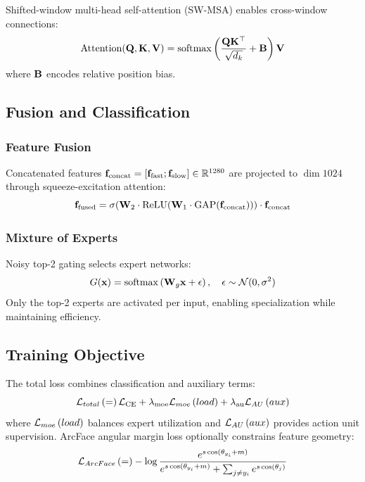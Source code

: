 Shifted-window multi-head self-attention (SW-MSA) enables cross-window connections:
\begin{equation}
\text{Attention}(\mathbf{Q}, \mathbf{K}, \mathbf{V}) = \mathrm{softmax}\left( \frac{\mathbf{Q}\mathbf{K}^\top}{\sqrt{d_k}} + \mathbf{B} \right) \mathbf{V}
\end{equation}
where $\mathbf{B}$ encodes relative position bias.

\subsection{Fusion and Classification}

\subsubsection{Feature Fusion}

Concatenated features $\mathbf{f}_{\text{concat}} = [\mathbf{f}_{\text{fast}}; \mathbf{f}_{\text{slow}}] \in \mathbb{R}^{1280}$ are projected to $\dim{1024}$ through squeeze-excitation attention:
\begin{equation}
\mathbf{f}_{\text{fused}} = \sigma(\mathbf{W}_2 \cdot \mathrm{ReLU}(\mathbf{W}_1 \cdot \text{GAP}(\mathbf{f}_{\text{concat}}))) \cdot \mathbf{f}_{\text{concat}}
\end{equation}

\subsubsection{Mixture of Experts}

Noisy top-2 gating selects expert networks:
\begin{equation}
G(\mathbf{x}) = \mathrm{softmax}\left( \mathbf{W}_g \mathbf{x} + \epsilon \right), \quad \epsilon \sim \mathcal{N}(0, \sigma^2)
\end{equation}
Only the top-2 experts are activated per input, enabling specialization while maintaining efficiency.

\subsection{Training Objective}

The total loss combines classification and auxiliary terms:
\begin{equation}
\mathcal{L}_{total}\left( = \right) \mathcal{L}_{\mathrm{CE}} + \lambda_{\text{moe}} \mathcal{L}_{moe}\left( load \right) + \lambda_{\text{au}} \mathcal{L}_{AU}\left( aux \right)
\end{equation}
where $\mathcal{L}_{moe}\left( load \right)$ balances expert utilization and $\mathcal{L}_{AU}\left( aux \right)$ provides action unit supervision. ArcFace angular margin loss optionally constrains feature geometry:
\begin{equation}
\mathcal{L}_{ArcFace}\left( = \right) -\log \frac{e^{s \cos(\theta_{y_i} + m)}}{e^{s \cos(\theta_{y_i} + m)} + \sum_{j \neq y_i} e^{s \cos(\theta_j)}}
\end{equation}